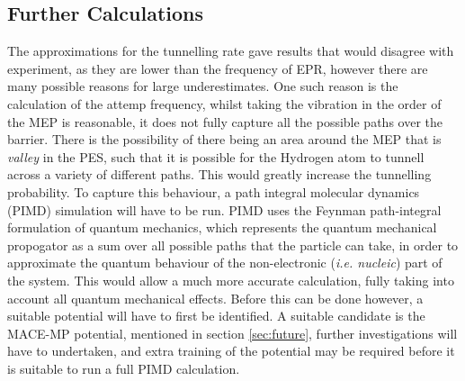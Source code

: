 \documentclass[10pt,a4paper,twocolumn,twoside]{extarticle}
\begin{document}
\subsection{Further Calculations}
The approximations for the tunnelling rate gave results that would disagree with experiment, as they are lower than the frequency of EPR, however there are many possible reasons for large underestimates. One such reason is the calculation of the attemp frequency, whilst taking the vibration in the order of the MEP is reasonable, it does not fully capture all the possible paths over the barrier. There is the possibility of there being an area around the MEP that is \emph{valley} in the PES, such that it is possible for the Hydrogen atom to tunnell across a variety of different paths. This would greatly increase the tunnelling probability. To capture this behaviour, a path integral molecular dynamics (PIMD) simulation will have to be run. PIMD uses the Feynman path-integral formulation of quantum mechanics,  which represents the quantum mechanical propogator as a sum over all possible paths that the particle can take, in order to approximate the quantum behaviour of the non-electronic (\emph{i.e. nucleic}) part of the system. This would allow a much more accurate calculation, fully taking into account all quantum mechanical effects. 
Before this can be done however, a suitable potential will have to first be identified. A suitable candidate is the MACE-MP potential, mentioned in section \ref{sec:future}, further investigations will have to undertaken, and extra training of the potential may be required before it is suitable to run a full PIMD calculation.

\end{document}
